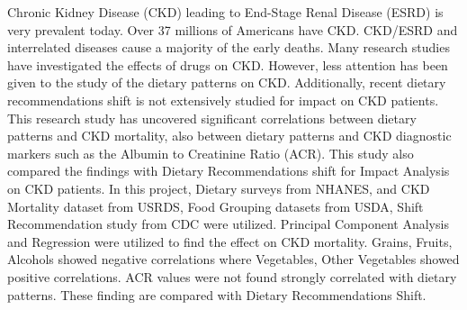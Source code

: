 Chronic Kidney Disease (CKD) leading to End-Stage Renal Disease (ESRD) is very prevalent today. Over 37 millions of Americans have CKD. CKD/ESRD and interrelated diseases cause a majority of the early deaths.  Many research studies have investigated the effects of drugs on CKD. However, less attention has been given to the study of the dietary patterns on CKD. Additionally, recent dietary recommendations shift is not extensively studied for impact on CKD patients. This research study has uncovered significant correlations between dietary patterns and CKD mortality, also between  dietary patterns  and CKD diagnostic markers such as the Albumin to Creatinine Ratio (ACR). This study also compared the findings with Dietary Recommendations shift for Impact Analysis on CKD patients. In this project, Dietary surveys from NHANES, and CKD Mortality dataset from USRDS, Food Grouping datasets from USDA, Shift Recommendation study from CDC were utilized. Principal Component Analysis and Regression were utilized to find the effect on CKD mortality. Grains, Fruits, Alcohols showed negative correlations where Vegetables, Other Vegetables showed positive correlations. ACR values were not found strongly correlated with dietary patterns. These finding are compared with Dietary Recommendations Shift.

